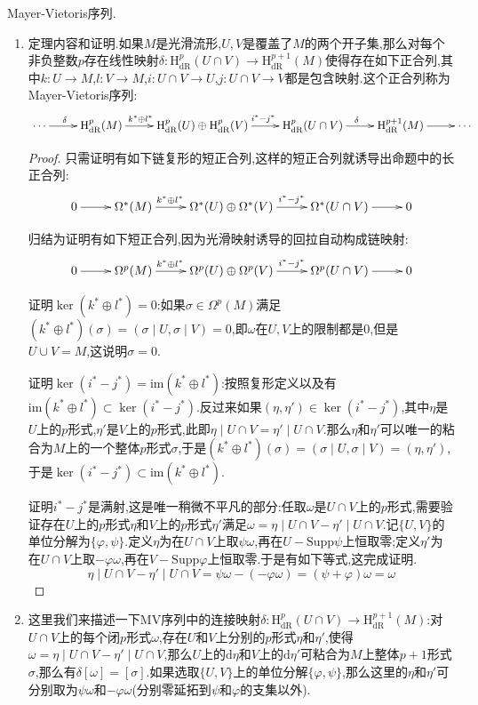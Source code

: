 Mayer-Vietoris序列.
\begin{enumerate}
	\item 定理内容和证明.如果$M$是光滑流形,$U,V$是覆盖了$M$的两个开子集,那么对每个非负整数$p$存在线性映射$\delta:\mathrm{H}^p_{\mathrm{dR}}(U\cap V)\to\mathrm{H}^{p+1}_{\mathrm{dR}}(M)$使得存在如下正合列,其中$k:U\to M$,$l:V\to M$,$i:U\cap V\to U$,$j:U\cap V\to V$都是包含映射.这个正合列称为Mayer-Vietoris序列:
	$$\xymatrix{\cdots\ar[r]^{\delta\quad}&\mathrm{H}^p_{\mathrm{dR}}(M)\ar[r]^{k^*\oplus l^*\qquad}&\mathrm{H}^p_{\mathrm{dR}}(U)\oplus\mathrm{H}^p_{\mathrm{dR}}(V)\ar[r]^{\quad i^*-j^*}&\mathrm{H}^p_{\mathrm{dR}}(U\cap V)\ar[r]^{\delta}&\mathrm{H}^{p+1}_{\mathrm{dR}}(M)\ar[r]&\cdots}$$
	\begin{proof}
		
		只需证明有如下链复形的短正合列,这样的短正合列就诱导出命题中的长正合列:
		$$\xymatrix{0\ar[r]&\Omega^*(M)\ar[r]^{k^*\oplus l^*\qquad}&\Omega^*(U)\oplus\Omega^*(V)\ar[r]^{\quad i^*-j^*}&\Omega^*(U\cap V)\ar[r]&0}$$
		
		归结为证明有如下短正合列,因为光滑映射诱导的回拉自动构成链映射:
		$$\xymatrix{0\ar[r]&\Omega^p(M)\ar[r]^{k^*\oplus l^*\qquad}&\Omega^p(U)\oplus\Omega^p(V)\ar[r]^{\quad i^*-j^*}&\Omega^p(U\cap V)\ar[r]&0}$$
		
		证明$\ker(k^*\oplus l^*)=0$:如果$\sigma\in\Omega^p(M)$满足$(k^*\oplus l^*)(\sigma)=(\sigma\mid U,\sigma\mid V)=0$,即$\omega$在$U,V$上的限制都是0,但是$U\cup V=M$,这说明$\sigma=0$.
		
		证明$\ker(i^*-j^*)=\mathrm{im}(k^*\oplus l^*)$:按照复形定义以及有$\mathrm{im}(k^*\oplus l^*)\subset\ker(i^*-j^*)$.反过来如果$(\eta,\eta')\in\ker(i^*-j^*)$,其中$\eta$是$U$上的$p$形式,$\eta'$是$V$上的$p$形式,此即$\eta\mid U\cap V=\eta'\mid U\cap V$.那么$\eta$和$\eta'$可以唯一的粘合为$M$上的一个整体$p$形式$\sigma$,于是$(k^*\oplus l^*)(\sigma)=(\sigma\mid U,\sigma\mid V)=(\eta,\eta')$,于是$\ker(i^*-j^*)\subset\mathrm{im}(k^*\oplus l^*)$.
		
		证明$i^*-j^*$是满射,这是唯一稍微不平凡的部分:任取$\omega$是$U\cap V$上的$p$形式,需要验证存在$U$上的$p$形式$\eta$和$V$上的$p$形式$\eta'$满足$\omega=\eta\mid U\cap V-\eta'\mid U\cap V$.记$\{U,V\}$的单位分解为$\{\varphi,\psi\}$.定义$\eta$为在$U\cap V$上取$\psi\omega$,再在$U-\mathrm{Supp}\psi$上恒取零;定义$\eta'$为在$U\cap V$上取$-\varphi\omega$,再在$V-\mathrm{Supp}\varphi$上恒取零.于是有如下等式,这完成证明.
		$$\eta\mid U\cap V-\eta'\mid U\cap V=\psi\omega-(-\varphi\omega)=(\psi+\varphi)\omega=\omega$$
	\end{proof}
    \item 这里我们来描述一下MV序列中的连接映射$\delta:\mathrm{H}^p_{\mathrm{dR}}(U\cap V)\to\mathrm{H}^{p+1}_{\mathrm{dR}}(M)$:对$U\cap V$上的每个闭$p$形式$\omega$,存在$U$和$V$上分别的$p$形式$\eta$和$\eta'$,使得$\omega=\eta\mid U\cap V-\eta'\mid U\cap V$,那么$U$上的$\mathrm{d}\eta$和$V$上的$\mathrm{d}\eta'$可粘合为$M$上整体$p+1$形式$\sigma$,那么有$\delta[\omega]=[\sigma]$.如果选取$\{U,V\}$上的单位分解$\{\varphi,\psi\}$,那么这里的$\eta$和$\eta'$可分别取为$\psi\omega$和$-\varphi\omega$(分别零延拓到$\psi$和$\varphi$的支集以外).
\end{enumerate}

